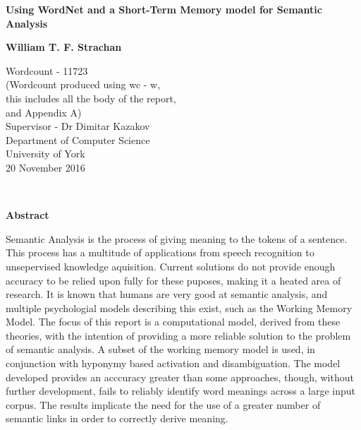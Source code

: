 \documentclass[]{article}
\begin{document}
\begin{titlepage}
    \begin{center}
        \vspace*{1cm}
        
        \Huge
        \textbf{Using WordNet and a Short-Term Memory model for Semantic Analysis}
        \vspace{2cm}
        
        \Large
        \textbf{William T. F. Strachan}
        
        \vfill
                
        \vspace{0.8cm}
        
        \Large
        Wordcount - 11723\\
        \small
        (Wordcount produced using wc - w, \\
        this includes all the body of the report,\\
         and Appendix A)\\
        \large
        \vspace{0.8cm}
        Supervisor - Dr Dimitar Kazakov\\
        Department of Computer Science\\
        University of York\\
        20 November 2016
        
    \end{center}
\end{titlepage}
\
\vfill
\begin{center} 
	\textbf{Abstract}
\end{center} 
\label{sec:Abstract}
Semantic Analysis is the process of giving meaning to the tokens of a sentence. This process has a multitude of applications from speech recognition to unsepervised knowledge aquisition. Current solutions do not provide enough accuracy to be relied upon fully for these puposes, making it a heated area of research. It is known that humans are very good at semantic analysis, and multiple psychologial models describing this exist, such as the Working Memory Model. The focus of this report is a computational model, derived from these theories, with the intention of providing a more reliable solution to the problem of semantic analysis. A subset of the working memory model is used, in conjunction with hyponymy based activation and disambiguation. The model developed provides an acccuracy greater than some approaches, though, without further development, fails to reliably identify word meanings across a large input corpus. The results implicate the need for the use of a greater number of semantic links in order to correctly derive meaning.
\end{document}

